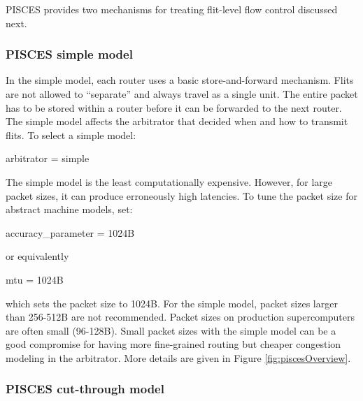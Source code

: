 PISCES provides two mechanisms for treating flit-level flow control discussed next.

\subsubsection{PISCES simple model}
\label{subsubsec:tutorial:simplePisces}
In the simple model, each router uses a basic store-and-forward mechanism.
Flits are not allowed to ``separate'' and always travel as a single unit.
The entire packet has to be stored within a router before it can be forwarded to the next router.
The simple model affects the arbitrator that decided when and how to transmit flits.
To select a simple model:

\begin{ViFile}
arbitrator = simple
\end{ViFile}
The simple model is the least computationally expensive. 
However, for large packet sizes, it can produce erroneously high latencies.
To tune the packet size for abstract machine models, set:

\begin{ViFile}
accuracy_parameter = 1024B
\end{ViFile}
or equivalently 

\begin{ViFile}
mtu = 1024B
\end{ViFile}
which sets the packet size to 1024B. 
For the simple model, packet sizes larger than 256-512B are not recommended.
Packet sizes on production supercomputers are often small (96-128B).
Small packet sizes with the simple model can be a good compromise for having more fine-grained routing but cheaper congestion modeling in the arbitrator.
More details are given in Figure \ref{fig:piscesOverview}.

\subsubsection{PISCES cut-through model}
\label{subsubsec:tutorial:cutThroughPisces}

